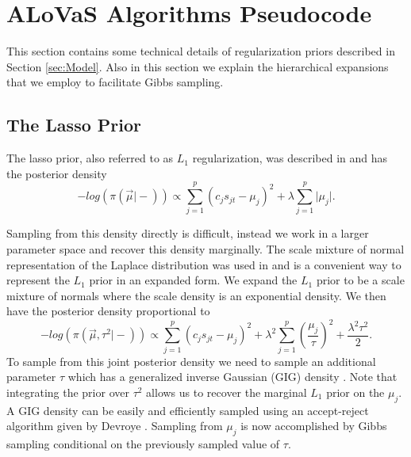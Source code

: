 \section{ALoVaS Algorithms Pseudocode}\label{sec:pseudo}

This section contains some technical details of regularization priors described in Section \ref{sec:Model}.
Also in this section we explain the hierarchical expansions that we employ to facilitate Gibbs sampling. 

		\subsection{The Lasso Prior}\label{sec:lasso_app}
		The lasso prior, also referred to as $L_1$ regularization, was described in \cite{tibshirani1996regression} and has the posterior density
\begin{equation}\label{eqn:l1_prior}
 -log(\pi(\vec{\mu} \vert -)) \propto \sum_{j=1}^p (c_j s_{jt} -\mu_j)^2 +\lambda\sum_{j=1}^p \vert \mu_j \vert.
 \end{equation} 
 
 Sampling from this density directly is difficult, instead we work in a larger parameter space and recover this density marginally. 	
The scale mixture of normal representation of the Laplace distribution was used in \cite{park2008bayesian} and is a convenient way to represent the $L_1$ prior in an expanded form. 
 We expand the $L_1$ prior to be a scale mixture of normals where the scale density is an exponential density. We then have the posterior density proportional to 
 \begin{equation}%
 -log(\pi(\vec{\mu}, \tau^2 \vert -)) \propto \sum_{j=1}^p (c_js_{jt}-\mu_j)^2 + \lambda^2\sum_{j=1}^p \left(\frac{\mu_j}{\tau}\right)^2 +\frac{\lambda^2\tau^2}{2}.\nonumber
 \end{equation}
To sample from this joint posterior density we need to sample an additional parameter $\tau$ which has a generalized inverse Gaussian (GIG) density \cite{chhikara1989inverse,devroye1986non}. Note that integrating the prior over $\tau^2$ allows us to recover the marginal $L_1$ prior on the $\mu_j$. A GIG density can be easily and efficiently sampled using an accept-reject algorithm given by Devroye \cite{devroye1986non}.  Sampling from $\mu_j$ is now accomplished by Gibbs sampling conditional on the previously sampled value of $\tau$. 

